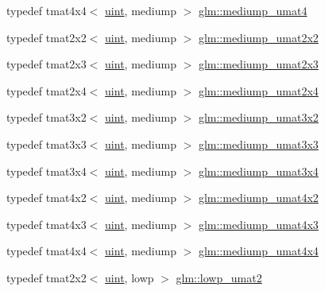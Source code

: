 \begin{DoxyCompactItemize}
\item 
typedef tmat4x4$<$ \hyperlink{stb__image_8c_a91ad9478d81a7aaf2593e8d9c3d06a14}{uint}, mediump $>$ \hyperlink{group__gtc__matrix__integer_ga3eb3a5d85ec876ba65fad5525a5dda56}{glm\+::mediump\+\_\+umat4}
\item 
typedef tmat2x2$<$ \hyperlink{stb__image_8c_a91ad9478d81a7aaf2593e8d9c3d06a14}{uint}, mediump $>$ \hyperlink{group__gtc__matrix__integer_gafce8777b8b0d9d7f810853b22de3be1b}{glm\+::mediump\+\_\+umat2x2}
\item 
typedef tmat2x3$<$ \hyperlink{stb__image_8c_a91ad9478d81a7aaf2593e8d9c3d06a14}{uint}, mediump $>$ \hyperlink{group__gtc__matrix__integer_ga23dfc19249ad27dc4b02615f1d045ba1}{glm\+::mediump\+\_\+umat2x3}
\item 
typedef tmat2x4$<$ \hyperlink{stb__image_8c_a91ad9478d81a7aaf2593e8d9c3d06a14}{uint}, mediump $>$ \hyperlink{group__gtc__matrix__integer_ga972445669c6e6652716f3f0b664b94cd}{glm\+::mediump\+\_\+umat2x4}
\item 
typedef tmat3x2$<$ \hyperlink{stb__image_8c_a91ad9478d81a7aaf2593e8d9c3d06a14}{uint}, mediump $>$ \hyperlink{group__gtc__matrix__integer_ga62243caa5b85b1cf91021ce6ffc21183}{glm\+::mediump\+\_\+umat3x2}
\item 
typedef tmat3x3$<$ \hyperlink{stb__image_8c_a91ad9478d81a7aaf2593e8d9c3d06a14}{uint}, mediump $>$ \hyperlink{group__gtc__matrix__integer_gaa55f7815a399a780907a1dcd4caef7d9}{glm\+::mediump\+\_\+umat3x3}
\item 
typedef tmat3x4$<$ \hyperlink{stb__image_8c_a91ad9478d81a7aaf2593e8d9c3d06a14}{uint}, mediump $>$ \hyperlink{group__gtc__matrix__integer_ga21a2361cc10822ad1a2297ac286c8e26}{glm\+::mediump\+\_\+umat3x4}
\item 
typedef tmat4x2$<$ \hyperlink{stb__image_8c_a91ad9478d81a7aaf2593e8d9c3d06a14}{uint}, mediump $>$ \hyperlink{group__gtc__matrix__integer_ga9dd5ce011ca43d90cf1b94084c7e90ac}{glm\+::mediump\+\_\+umat4x2}
\item 
typedef tmat4x3$<$ \hyperlink{stb__image_8c_a91ad9478d81a7aaf2593e8d9c3d06a14}{uint}, mediump $>$ \hyperlink{group__gtc__matrix__integer_gac91ed5aa76fe160d5ab5d31e2b94d95b}{glm\+::mediump\+\_\+umat4x3}
\item 
typedef tmat4x4$<$ \hyperlink{stb__image_8c_a91ad9478d81a7aaf2593e8d9c3d06a14}{uint}, mediump $>$ \hyperlink{group__gtc__matrix__integer_ga7141a9d9f1c26521e397be34d19c1b8f}{glm\+::mediump\+\_\+umat4x4}
\item 
typedef tmat2x2$<$ \hyperlink{stb__image_8c_a91ad9478d81a7aaf2593e8d9c3d06a14}{uint}, lowp $>$ \hyperlink{group__gtc__matrix__integer_ga0ff71fefa5bfab1462195c3de4f83f67}{glm\+::lowp\+\_\+umat2}

\end{DoxyCompactItemize}
